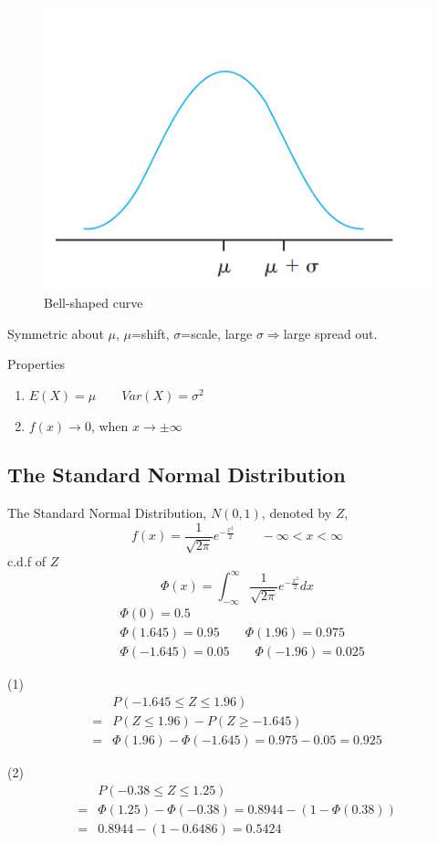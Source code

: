 \begin{figure}[H]
\centering
\includegraphics[scale=0.4]{figures/NormalDistro.png}
\caption{Bell-shaped curve}
\end{figure}
Symmetric about $\mu$, $\mu$=shift, $\sigma$=scale, large $\sigma\Rightarrow$large spread out.
 
\begin{prop}
Properties
\begin{enumerate}
\item $E(X)=\mu \qquad	Var(X)=\sigma^2$
\item $f(x) \to 0$, when $x \to \pm \infty$
\end{enumerate}
\end{prop}

\subsection{The Standard Normal Distribution}
The Standard Normal Distribution, $N(0,1)$, denoted by $Z$,
\[f(x)=\frac{1}{\sqrt{2 \pi}} e^{-\frac{x^2}{2}}  \qquad -\infty< x< \infty\]
c.d.f of $Z$
\[\Phi(x)=\int_{-\infty}^{\infty} \frac{1}{\sqrt{2 \pi}} e^{-\frac{x^2}{2}}  dx\]
\begin{align*}
&\Phi(0)=0.5 \\
&\Phi(1.645)=0.95 \qquad \Phi(1.96)=0.975 \\
&\Phi(-1.645)=0.05 \qquad \Phi(-1.96)=0.025
\end{align*}

\begin{exmp}
(1)
\begin{align*}
&P(-1.645 \leq Z \leq 1.96)\\
=&P(Z \leq 1.96)-P(Z \geq -1.645) \\
=&\Phi(1.96)-\Phi(-1.645)=0.975-0.05=0.925
\end{align*}

(2)
\begin{align*}
&P(-0.38 \leq Z \leq 1.25)\\
=&\Phi(1.25)-\Phi(-0.38)=0.8944-(1-\Phi(0.38))\\
=&0.8944-(1-0.6486)=0.5424
\end{align*}
\end{exmp}

